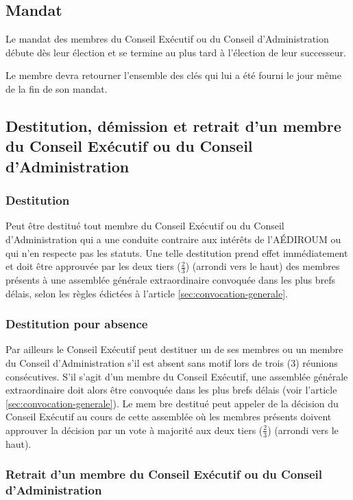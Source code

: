 \documentclass{aediroum}
\newcommand{\article}[1]{article \ref{#1}}
\begin{document}
\subsection{Mandat}\label{sec:mandat}
Le mandat des membres du Conseil Exécutif ou du Conseil d'Administration débute dès leur élection et se termine au plus tard à l'élection de leur successeur.

Le membre devra retourner l'ensemble des clés qui lui a été fourni le jour même de la fin de son mandat.

\subsection{Destitution, démission et retrait d'un membre du Conseil Exécutif ou du Conseil d'Administration}\label{sec:destitution-demission-retrait-exec-admin}
\subsubsection{Destitution}\label{sec:destitution}

Peut être destitué tout membre du Conseil Exécutif ou du Conseil d'Administration qui a une conduite contraire aux intérêts de l'AÉDIROUM ou qui n'en respecte pas les statuts. Une telle destitution prend effet immédiatement et doit être approuvée par les deux tiers (\( \frac{2}{3} \)) (arrondi vers le haut) des membres présents à une assemblée générale extraordinaire convoquée dans les plus brefs délais, selon les règles édictées à l'\article{sec:convocation-generale}.

\subsubsection{Destitution pour absence}\label{sec:destitution-pour-absence}

Par ailleurs le Conseil Exécutif peut destituer un de ses membres ou un membre du Conseil d'Administration s'il est absent sans motif lors de trois (3) réunions consécutives. S'il s'agit d'un membre du Conseil Exécutif, une assemblée générale extraordinaire doit alors être convoquée dans les plus brefs délais (voir l'\article{sec:convocation-generale}). Le mem
bre destitué peut appeler de la décision du Conseil Exécutif au cours de cette assemblée où les membres présents doivent approuver la décision par un vote à majorité aux deux tiers (\( \frac{2}{3} \)) (arrondi vers le haut).

\subsubsection{Retrait d'un membre du Conseil Exécutif ou du Conseil d'Administration}\label{sec:retrait-dun-membre-exec-admin}
\end{document}

